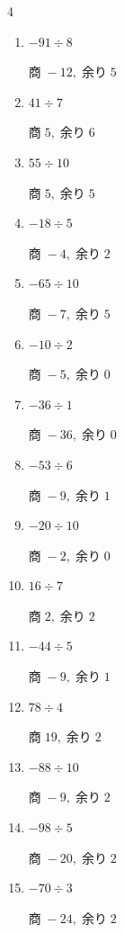 \begin{multicols}{4}
\begin{enumerate}
  \item $-91 \div 8$

        $商\; -12,\; 余り\; 5$

  \item $41 \div 7$

        $商\; 5,\; 余り\; 6$

  \item $55 \div 10$

        $商\; 5,\; 余り\; 5$

  \item $-18 \div 5$

        $商\; -4,\; 余り\; 2$

\columnbreak %

  \item $-65 \div 10$

        $商\; -7,\; 余り\; 5$

  \item $-10 \div 2$

        $商\; -5,\; 余り\; 0$

  \item $-36 \div 1$

        $商\; -36,\; 余り\; 0$

  \item $-53 \div 6$

        $商\; -9,\; 余り\; 1$

  \item $-20 \div 10$

        $商\; -2,\; 余り\; 0$

  \item $16 \div 7$

        $商\; 2,\; 余り\; 2$

  \item $-44 \div 5$

        $商\; -9,\; 余り\; 1$

  \item $78 \div 4$

        $商\; 19,\; 余り\; 2$

  \item $-88 \div 10$

        $商\; -9,\; 余り\; 2$

  \item $-98 \div 5$

        $商\; -20,\; 余り\; 2$

  \item $-70 \div 3$

        $商\; -24,\; 余り\; 2$


\end{enumerate}
\end{multicols}
